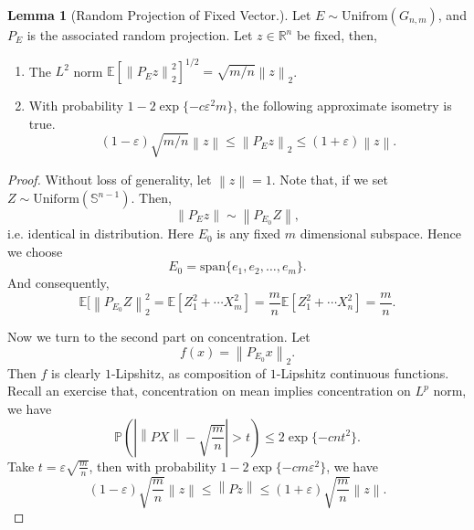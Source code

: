 \documentclass[9pt,onesided]{article}
\newcommand{\nm}[1]{\left\lVert#1\right\rVert}
\newcommand{\re}{\mathbb{R}}
\newcommand{\ex}[1]{\mathbb{E}[#1]}
\newcommand{\mc}{\color{BlueViolet}}
\renewcommand{\le}{\leqslant}
\newcommand{\s}{\mathbb{S}}
\newcommand{\p}{\mathbb{P}}
\theoremstyle{definition}
\newtheorem{lemma}{\mc Lemma}
\begin{document}
\begin{lemma}
[Random Projection of Fixed Vector.] Let $E\sim\mathrm{Unifrom}(G_{n,m})$, and $P_E$ is the associated random projection. Let $z\in \re^n$ be fixed, then,
\begin{enumerate}
    \item  The $L^2$ norm $\ex{\nm{P_E z}^2_2}^{1/2}=\sqrt{m/n}\nm{z}_2$.
    \item With probability $1-2\exp\{-c\varepsilon^2m\}$, the following approximate isometry is true.
    \begin{equation*}
        (1-\varepsilon) \sqrt{m/n} \nm{z}\le \nm{P_Ez }_2\le (1+\varepsilon) \nm{z}.
    \end{equation*}
\end{enumerate}
\end{lemma}

\begin{proof}
Without loss of generality, let $\nm{z}=1$. Note that, if we set $Z\sim \mathrm{Uniform}(\s^{n-1})$. Then, 
\begin{equation*}
    \nm{P_Ez}\sim \nm{P_{E_0}Z},
\end{equation*}
i.e. identical in distribution. Here $E_0$ is any fixed $m$ dimensional subspace. Hence we choose
\begin{equation*}
    E_0=\mathrm{span}\{e_1,e_2,\dots ,e_m\}.
\end{equation*}
And consequently, 
\begin{equation*}
    \mathbb{E}[\nm{P_{E_0} Z}_2^2=\ex{Z_1^2+\cdots X_m^2}=\frac{m}{n}\ex{Z_1^2+\cdots X_n^2}=\frac{m}{n}.
\end{equation*}

Now we turn to the second part on concentration. Let
\begin{equation*}
    f(x) = \nm{P_{E_0}x}_{2}.
\end{equation*}
Then $f$ is clearly $1$-Lipshitz, as composition of $1$-Lipshitz continuous functions. Recall an exercise that, concentration on mean implies concentration on $L^p$ norm, we have
\begin{equation*}
    \p(\left| \nm{PX} -\sqrt{\frac{m}{n}}\right|>t)\le 2\exp \{-cnt^2\}.
\end{equation*}
Take $t=\varepsilon\sqrt{\frac{m}{n}}$, then with probability $1 -2\exp\{-cm\varepsilon^2\}$, we have
\begin{equation*}
    (1-\varepsilon)\sqrt{\frac{m}{n}}\nm{z} \le \nm{Pz}\le (1+\varepsilon)\sqrt{\frac{m}{n}}\nm{z}.
\end{equation*}

\end{proof}
\end{document}
